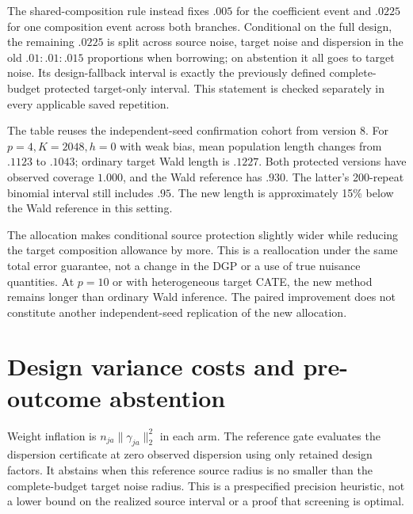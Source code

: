 \documentclass[11pt]{article}
\begin{document}
The shared-composition rule instead fixes $.005$ for the coefficient event
and $.0225$ for one composition event across both branches. Conditional on
the full design, the remaining $.0225$ is split across source noise, target
noise and dispersion in the old $.01:.01:.015$ proportions when borrowing;
on abstention it all goes to target noise. Its design-fallback interval is
exactly the previously defined complete-budget protected target-only interval.
This statement is checked separately in every applicable saved repetition.

\begin{center}\small
\resizebox{\linewidth}{!}{}
\end{center}

The table reuses the independent-seed confirmation cohort from version 8.
For $p=4,K=2048,h=0$ with weak bias, mean population length changes from
$.1123$ to $.1043$; ordinary target Wald length is $.1227$. Both protected
versions have observed coverage $1.000$, and the Wald reference has $.930$.
The latter's 200-repeat binomial interval still includes $.95$. The new
length is approximately 15\% below the Wald reference in this setting.

The allocation makes conditional source protection slightly wider while
reducing the target composition allowance by more. This is a reallocation
under the same total error guarantee, not a change in the DGP or a use of
true nuisance quantities. At $p=10$ or with heterogeneous target CATE, the
new method remains longer than ordinary Wald inference. The paired improvement
does not constitute another independent-seed replication of the new allocation.

\section{Design variance costs and pre-outcome abstention}

Weight inflation is $n_{ja}\|\gamma_{ja}\|_2^2$ in each arm. The reference
gate evaluates the dispersion certificate at zero observed dispersion using
only retained design factors. It abstains when this reference source radius
is no smaller than the complete-budget target noise radius. This is a
prespecified precision heuristic, not a lower bound on the realized source
interval or a proof that screening is optimal.

\begin{center}\small
\resizebox{\linewidth}{!}{}
\end{center}
\end{document}
